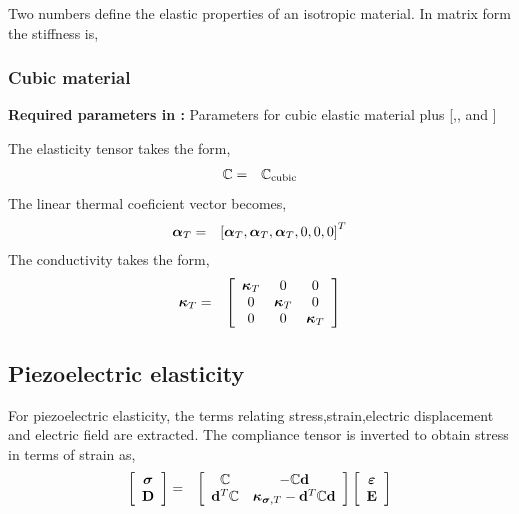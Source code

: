 Two numbers define the elastic properties of an isotropic material.
In matrix form the stiffness is,

\subsubsection{Cubic material}
\begin{flushleft}
  \textbf{Required parameters in :}
  Parameters for cubic elastic material plus [,, and ]
\end{flushleft}
The elasticity tensor takes the form,
\begin{eqnarray}
\mathbb{C} &=& \mathbb{C}_\text{cubic}
\end{eqnarray}
The linear thermal coeficient vector becomes,
\begin{eqnarray}
\boldsymbol{\alpha}_T &=& \left[\boldsymbol{\alpha}_T,\boldsymbol{\alpha}_T,\boldsymbol{\alpha}_T,0,0,0  \right]^T
\end{eqnarray}
The conductivity takes the form,
\begin{eqnarray}
\boldsymbol{\kappa}_T &=&
\left[
\begin{array}{ccc}
\boldsymbol{\kappa}_T & 0 & 0 \\
0 & \boldsymbol{\kappa}_T & 0 \\
0 & 0 & \boldsymbol{\kappa}_T
\end{array}
\right]
\end{eqnarray}


\clearpage
\subsection{Piezoelectric elasticity }
For piezoelectric elasticity, the terms relating stress,strain,electric displacement and
electric field are
extracted. The compliance tensor is inverted to obtain stress in
terms of strain as,
\begin{eqnarray}
\left[
\begin{array}{c}
\boldsymbol{\sigma} \\
\mathbf{D}
\end{array}
\right]
&=&
\left[
\begin{array}{cc}
\mathbb{C} & -\mathbb{C}\mathbf{d} \\
\mathbf{d}^T\mathbb{C} & \boldsymbol{\kappa}_{\boldsymbol{\sigma},T}-\mathbf{d}^T\mathbb{C}\mathbf{d}
\end{array}
\right]
\left[
\begin{array}{c}
\boldsymbol{\varepsilon} \\
\mathbf{E}
\end{array}
\right]
\end{eqnarray}

